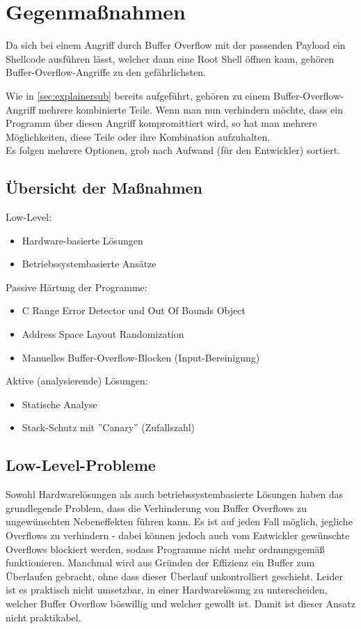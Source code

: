 \pagebreak
\section{Gegenmaßnahmen}
Da sich bei einem Angriff durch Buffer Overflow mit der passenden Payload
ein Shellcode ausführen lässt, welcher dann eine Root Shell
öffnen kann, gehören
Buffer-Overflow-Angriffe zu den gefährlichsten.

Wie in \autoref{sec:explainersub} bereits aufgeführt,
gehören zu einem Buffer-Overflow-Angriff mehrere kombinierte Teile. Wenn
man nun verhindern möchte, dass ein Programm über diesen Angriff kompromittiert wird, 
so hat man mehrere Möglichkeiten, diese Teile oder ihre Kombination aufzuhalten. \cite{Werthmann2006SurveyOB}\\

Es folgen mehrere Optionen, grob nach Aufwand (für den Entwickler) sortiert.
\subsection{Übersicht der Maßnahmen}
Low-Level:
\begin{itemize}
    \item Hardware-basierte Lösungen
    \item Betriebssystembasierte Ansätze
\end{itemize}
Passive Härtung der Programme:
\begin{itemize}
    \item C Range Error Detector und Out Of Bounds Object
    \item Address Space Layout Randomization
    \item Manuelles Buffer-Overflow-Blocken (Input-Bereinigung)
\end{itemize}
Aktive (analysierende) Lösungen:
\begin{itemize}
    \item Statische Analyse
    \item Stack-Schutz mit ''Canary'' (Zufallszahl)
\end{itemize}

\subsection{Low-Level-Probleme}
Sowohl Hardwarelösungen als auch betriebssystembasierte Lösungen haben
das grundlegende Problem, dass die Verhinderung von Buffer Overflows zu
ungewünschten Nebeneffekten führen kann. Es ist auf jeden Fall möglich,
jegliche Overflows zu verhindern - dabei können jedoch auch vom
Entwickler gewünschte Overflows blockiert werden, sodass Programme nicht mehr
ordnungsgemäß funktionieren. Manchmal wird aus Gründen der Effizienz ein
Buffer zum Überlaufen gebracht, ohne dass dieser Überlauf unkontrolliert
geschieht. Leider ist es praktisch nicht umsetzbar, in einer Hardwarelösung
zu unterscheiden, welcher Buffer Overflow böswillig und welcher gewollt ist. 
Damit ist dieser Ansatz nicht praktikabel.
\pagebreak

